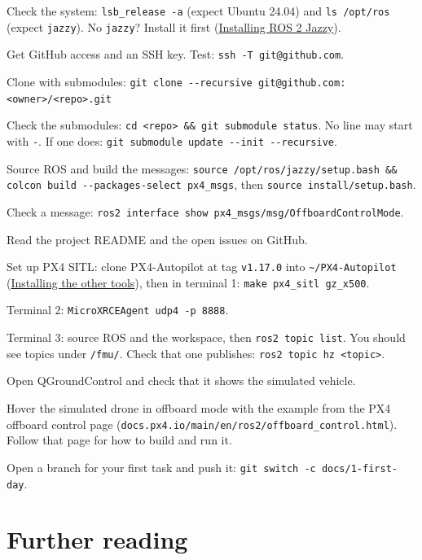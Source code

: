 \documentclass[11pt,a4paper]{article}
\begin{document}
\begin{checklist}
	\item
	Check the system: \texttt{lsb\_release -a} (expect Ubuntu 24.04) and
	\texttt{ls /opt/ros} (expect \texttt{jazzy}). No \texttt{jazzy}?
	Install it first (\hyperref[installing-ros-2-jazzy]{Installing ROS 2
		Jazzy}).
	\item
	Get GitHub access and an SSH key. Test:
	\texttt{ssh -T git@github.com}.
	\item
	Clone with submodules:
	\texttt{git clone -\/-recursive git@github.com:\textless{}owner\textgreater{}/\textless{}repo\textgreater{}.git}
	\item
	Check the submodules:
	\texttt{cd \textless{}repo\textgreater{} \&\& git submodule status}.
	No line may start with \texttt{-}. If one does:
	\texttt{git submodule update -\/-init -\/-recursive}.
	\item
	Source ROS and build the messages:
	\texttt{source /opt/ros/jazzy/setup.bash \&\& colcon build -\/-packages-select px4\_msgs},
	then \texttt{source install/setup.bash}.
	\item
	Check a message:
	\texttt{ros2 interface show px4\_msgs/msg/OffboardControlMode}.
	\item
	Read the project README and the open issues on GitHub.
	\item
	Set up PX4 SITL: clone PX4-Autopilot at tag \texttt{v1.17.0} into
	\texttt{\textasciitilde{}/PX4-Autopilot}
	(\hyperref[installing-the-other-tools]{Installing the other tools}),
	then in terminal 1:
	\texttt{make px4\_sitl gz\_x500}.
	\item
	Terminal 2: \texttt{MicroXRCEAgent udp4 -p 8888}.
	\item
	Terminal 3: source ROS and the workspace, then
	\texttt{ros2 topic list}. You should see topics under
	\texttt{/fmu/}. Check that one publishes:
	\texttt{ros2 topic hz \textless{}topic\textgreater{}}.
	\item
	Open QGroundControl and check that it shows the simulated vehicle.
	\item
	Hover the simulated drone in offboard mode with the example from the
	PX4 offboard control page
	(\texttt{docs.px4.io/main/en/ros2/offboard\_control.html}). Follow
	that page for how to build and run it.
	\item
	Open a branch for your first task and push it:
	\texttt{git switch -c docs/1-first-day}.
\end{checklist}

\section{Further reading}\label{further-reading}
\end{document}
